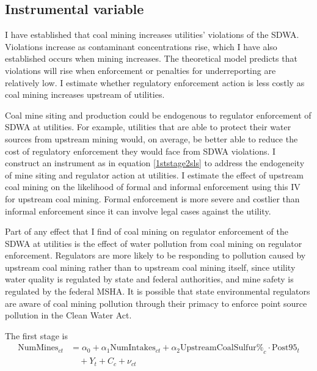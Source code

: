 \documentclass{article}
\begin{document}
\subsection{Instrumental variable}

I have established that coal mining increases utilities' violations of the SDWA. Violations increase as contaminant concentrations rise, which I have also established occurs when mining increases. The theoretical model predicts that violations will rise when enforcement or penalties for underreporting are relatively low. I estimate whether regulatory enforcement action is less costly as coal mining increases upstream of utilities. 

Coal mine siting and production could be endogenous to regulator enforcement of SDWA at utilities. For example, utilities that are able to protect their water sources from upstream mining would, on average, be better able to reduce the cost of regulatory enforcement they would face from SDWA violations. I construct an instrument as in equation \ref{1ststage2sls} to address the endogeneity of mine siting and regulator action at utilities. I estimate the effect of upstream coal mining on the likelihood of formal and informal enforcement using this IV for upstream coal mining. Formal enforcement is more severe and costlier than informal enforcement since it can involve legal cases against the utility.

Part of any effect that I find of coal mining on regulator enforcement of the SDWA at utilities is the effect of water pollution from coal mining on regulator enforcement. Regulators are more likely to be responding to pollution caused by upstream coal mining rather than to upstream coal mining itself, since utility water quality is regulated by state and federal authorities, and mine safety is regulated by the federal MSHA. It is possible that state environmental regulators are aware of coal mining pollution through their primacy to enforce point source pollution in the Clean Water Act.

The first stage is
\begin{equation}\label{1ststage2slsreg}
\begin{split}
\text{NumMines}_{ct} &= \alpha_0 + \alpha_1\text{NumIntakes}_{ct} + \alpha_2\text{UpstreamCoalSulfur\%}_c \cdot \text{Post95}_t \\
&\quad + Y_t + C_c + \nu_{ct}
\end{split}
\end{equation}
\end{document}
